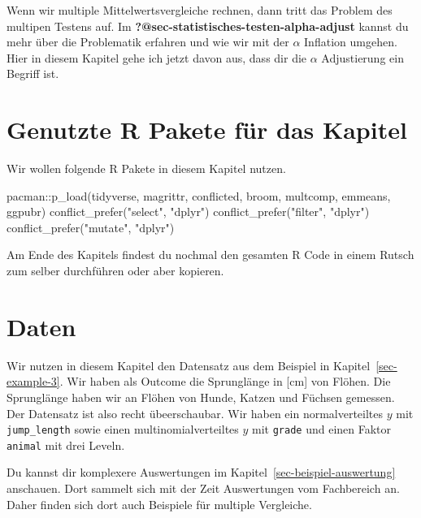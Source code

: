 \documentclass[
  letterpaper,
  DIV=11,
  oneside]{scrreport}
\newenvironment{Shaded}{\begin{snugshade}}{\end{snugshade}}
\newcommand{\FunctionTok}[1]{\textcolor[rgb]{0.28,0.35,0.67}{#1}}
\newcommand{\NormalTok}[1]{\textcolor[rgb]{0.00,0.23,0.31}{#1}}
\newcommand{\SpecialCharTok}[1]{\textcolor[rgb]{0.37,0.37,0.37}{#1}}
\newcommand{\StringTok}[1]{\textcolor[rgb]{0.13,0.47,0.30}{#1}}
\begin{document}
Wenn wir multiple Mittelwertsvergleiche rechnen, dann tritt das Problem
des multipen Testens auf. Im
\textbf{?@sec-statistisches-testen-alpha-adjust} kannst du mehr über die
Problematik erfahren und wie wir mit der \(\alpha\) Inflation umgehen.
Hier in diesem Kapitel gehe ich jetzt davon aus, dass dir die \(\alpha\)
Adjustierung ein Begriff ist.

\hypertarget{genutzte-r-pakete-fuxfcr-das-kapitel-9}{%
\section{Genutzte R Pakete für das
Kapitel}\label{genutzte-r-pakete-fuxfcr-das-kapitel-9}}

Wir wollen folgende R Pakete in diesem Kapitel nutzen.

\begin{Shaded}
\begin{Highlighting}[]
\NormalTok{pacman}\SpecialCharTok{::}\FunctionTok{p\_load}\NormalTok{(tidyverse, magrittr, conflicted, broom,}
\NormalTok{               multcomp, emmeans, ggpubr)}
\FunctionTok{conflict\_prefer}\NormalTok{(}\StringTok{"select"}\NormalTok{, }\StringTok{"dplyr"}\NormalTok{)}
\FunctionTok{conflict\_prefer}\NormalTok{(}\StringTok{"filter"}\NormalTok{, }\StringTok{"dplyr"}\NormalTok{)}
\FunctionTok{conflict\_prefer}\NormalTok{(}\StringTok{"mutate"}\NormalTok{, }\StringTok{"dplyr"}\NormalTok{)}
\end{Highlighting}
\end{Shaded}

Am Ende des Kapitels findest du nochmal den gesamten R Code in einem
Rutsch zum selber durchführen oder aber kopieren.

\hypertarget{daten}{%
\section{Daten}\label{daten}}

Wir nutzen in diesem Kapitel den Datensatz aus dem Beispiel in
Kapitel~\ref{sec-example-3}. Wir haben als Outcome die Sprunglänge in
{[}cm{]} von Flöhen. Die Sprunglänge haben wir an Flöhen von Hunde,
Katzen und Füchsen gemessen. Der Datensatz ist also recht übeerschaubar.
Wir haben ein normalverteiltes \(y\) mit \texttt{jump\_length} sowie
einen multinomialverteiltes \(y\) mit \texttt{grade} und einen Faktor
\texttt{animal} mit drei Leveln.

Du kannst dir komplexere Auswertungen im
Kapitel~\ref{sec-beispiel-auswertung} anschauen. Dort sammelt sich mit
der Zeit Auswertungen vom Fachbereich an. Daher finden sich dort auch
Beispiele für multiple Vergleiche.
\end{document}
